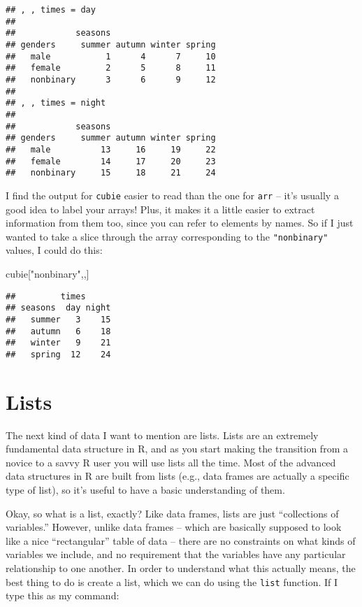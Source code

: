 \documentclass[]{book}
\newenvironment{Shaded}{\begin{snugshade}}{\end{snugshade}}
\newcommand{\NormalTok}[1]{#1}
\newcommand{\StringTok}[1]{\textcolor[rgb]{0.31,0.60,0.02}{#1}}
\begin{document}
\begin{verbatim}
## , , times = day
## 
##            seasons
## genders     summer autumn winter spring
##   male           1      4      7     10
##   female         2      5      8     11
##   nonbinary      3      6      9     12
## 
## , , times = night
## 
##            seasons
## genders     summer autumn winter spring
##   male          13     16     19     22
##   female        14     17     20     23
##   nonbinary     15     18     21     24
\end{verbatim}

I find the output for \texttt{cubie} easier to read than the one for \texttt{arr} -- it's usually a good idea to label your arrays! Plus, it makes it a little easier to extract information from them too, since you can refer to elements by names. So if I just wanted to take a slice through the array corresponding to the \texttt{"nonbinary"} values, I could do this:

\begin{Shaded}
\begin{Highlighting}[]
\NormalTok{cubie[}\StringTok{"nonbinary"}\NormalTok{,,]}
\end{Highlighting}
\end{Shaded}

\begin{verbatim}
##         times
## seasons  day night
##   summer   3    15
##   autumn   6    18
##   winter   9    21
##   spring  12    24
\end{verbatim}

\hypertarget{lists}{%
\section{Lists}\label{lists}}

The next kind of data I want to mention are lists. Lists are an extremely fundamental data structure in R, and as you start making the transition from a novice to a savvy R user you will use lists all the time. Most of the advanced data structures in R are built from lists (e.g., data frames are actually a specific type of list), so it's useful to have a basic understanding of them.

Okay, so what is a list, exactly? Like data frames, lists are just ``collections of variables.'' However, unlike data frames -- which are basically supposed to look like a nice ``rectangular'' table of data -- there are no constraints on what kinds of variables we include, and no requirement that the variables have any particular relationship to one another. In order to understand what this actually means, the best thing to do is create a list, which we can do using the \texttt{list} function. If I type this as my command:
\end{document}
